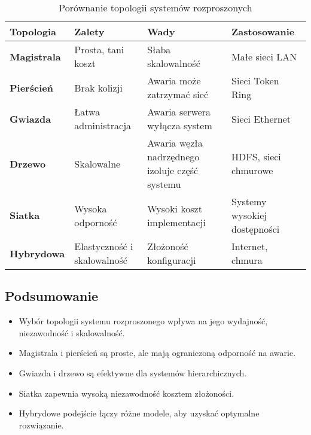 \begin{table}[h]
    \centering
    \renewcommand{\arraystretch}{1.3} %
    \begin{tabularx}{\textwidth}{|l|X|X|X|}
        \hline
        \textbf{Topologia} & \textbf{Zalety} & \textbf{Wady} & \textbf{Zastosowanie} \\
        \hline
        \textbf{Magistrala} & Prosta, tani koszt & Słaba skalowalność & Małe sieci LAN \\
        \hline
        \textbf{Pierścień} & Brak kolizji & Awaria może zatrzymać sieć & Sieci Token Ring \\
        \hline
        \textbf{Gwiazda} & Łatwa administracja & Awaria serwera wyłącza system & Sieci Ethernet \\
        \hline
        \textbf{Drzewo} & Skalowalne & Awaria węzła nadrzędnego izoluje część systemu & HDFS, sieci chmurowe \\
        \hline
        \textbf{Siatka} & Wysoka odporność & Wysoki koszt implementacji & Systemy wysokiej dostępności \\
        \hline
        \textbf{Hybrydowa} & Elastyczność i skalowalność & Złożoność konfiguracji & Internet, chmura \\
        \hline
    \end{tabularx}
    \caption{Porównanie topologii systemów rozproszonych}
\end{table}


\subsection{Podsumowanie}
\begin{itemize}
    \item Wybór topologii systemu rozproszonego wpływa na jego wydajność, niezawodność i skalowalność.
    \item Magistrala i pierścień są proste, ale mają ograniczoną odporność na awarie.
    \item Gwiazda i drzewo są efektywne dla systemów hierarchicznych.
    \item Siatka zapewnia wysoką niezawodność kosztem złożoności.
    \item Hybrydowe podejście łączy różne modele, aby uzyskać optymalne rozwiązanie.
\end{itemize}
